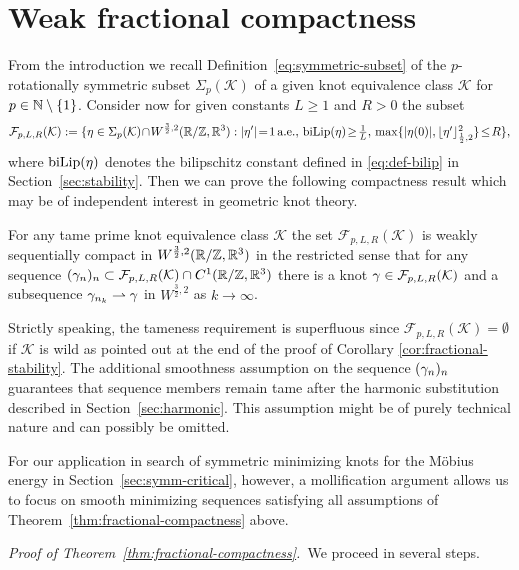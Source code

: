 \section{Weak fractional compactness}\label{sec:compactness}
From the introduction we recall  
Definition~\eqref{eq:symmetric-subset} of
the $p$-rotationally symmetric subset $\Sigma_p(\mathcal{K})$ of a given
knot equivalence class $\mathcal{K}$ for $p\in\mathbb{N}\setminus\{1\}$. 
Consider now for given constants
$L\ge 1$ and $R>0$ the subset
\begin{equation}\label{eq:compact-subset}
\mathcal{F}_{p,L,R}(\mathcal{K}):=
\{\eta\in\Sigma_p(\mathcal{K})\!\cap\! W^{\frac32,2}(\R/\Z,\R^3):
|\eta'|\!=\!1\,\textnormal{a.e.},\,\bilip(\eta)\!\ge\!
\textstyle\frac1{L},\,\max\{|\eta(0)|,\lfloor\eta'
\rfloor^2_{\frac12,2}\}\!\le\! R\},
\end{equation}
where $\operatorname{biLip}(\eta)$ denotes the bilipschitz constant defined in
\eqref{eq:def-bilip} in Section~\ref{sec:stability}. Then
we can prove the following compactness result which may be of
independent interest in geometric knot theory.
\begin{theorem}
\label{thm:fractional-compactness}
For any tame prime knot equivalence class  $\mathcal{K}$ the set
$\mathcal{F}_{p,L,R}(\mathcal{K})$ is weakly sequentially compact
in $W^{\frac32,2}(\mathbb{R}/\mathbb{Z},\mathbb{R}^3)$ in the restricted sense that for any sequence
$(\gamma_n)_n\subset \mathcal{F}_{p,L,R}(\mathcal{K})\cap C^1(\mathbb{R}/\mathbb{Z},\mathbb{R}^3)$ 
there is a knot
$\gamma\in\mathcal{F}_{p,L,R}(\mathcal{K})$ and a 
subsequence $\gamma_{n_k}\rightharpoonup \gamma$ in $W^{\frac32,2}$ as $k\to\infty$.
\end{theorem}

Strictly speaking, the tameness requirement is superfluous since
$\mathcal{F}_{p,L,R}(\mathcal{K})=\emptyset$ if $\mathcal K$ is wild
as pointed out at the end of the proof of Corollary \ref{cor:fractional-stability}.
The additional smoothness assumption on the sequence $(\gamma_n)_n$ guarantees 
that sequence members remain tame after the harmonic substitution described
in Section~\ref{sec:harmonic}. This assumption might 
be of purely technical
nature and can possibly be omitted.

For our application 
in search of symmetric minimizing knots for the M\"obius energy
in Section~\ref{sec:symm-critical}, however, a mollification argument
allows us to focus on smooth minimizing sequences satisfying all assumptions
of Theorem~\ref{thm:fractional-compactness} above.

\noindent
{\it Proof of Theorem~\ref{thm:fractional-compactness}.}\,
We proceed in several steps.

